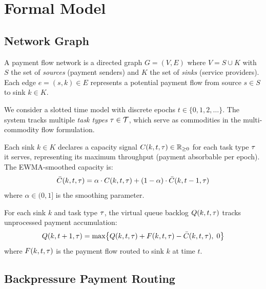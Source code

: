 \section{Formal Model}
\label{sec:model}

\subsection{Network Graph}

\begin{definition}
A payment flow network is a directed graph $G = (V, E)$ where $V = S \cup K$ with
$S$ the set of \emph{sources} (payment senders) and $K$ the set of \emph{sinks}
(service providers). Each edge $e = (s, k) \in E$ represents a potential payment
flow from source $s \in S$ to sink $k \in K$.
\end{definition}

We consider a slotted time model with discrete epochs $t \in \{0, 1, 2, \ldots\}$.
The system tracks multiple \emph{task types} $\tau \in \mathcal{T}$, which
serve as commodities in the multi-commodity flow formulation.

\begin{definition}
Each sink $k \in K$ declares a capacity signal $C(k, t, \tau) \in \mathbb{R}_{\geq 0}$
for each task type $\tau$ it serves, representing its maximum throughput
(payment absorbable per epoch). The EWMA-smoothed capacity is:
\begin{equation}
\label{eq:ewma}
\bar{C}(k, t, \tau) = \alpha \cdot C(k, t, \tau)
    + (1 - \alpha) \cdot \bar{C}(k, t-1, \tau)
\end{equation}
where $\alpha \in (0, 1]$ is the smoothing parameter.
\end{definition}

\begin{definition}
For each sink $k$ and task type $\tau$, the virtual queue backlog
$Q(k, t, \tau)$ tracks unprocessed payment accumulation:
\begin{equation}
\label{eq:queue}
Q(k, t+1, \tau) = \max\bigl\{Q(k, t, \tau) + F(k, t, \tau)
    - \bar{C}(k, t, \tau),\; 0\bigr\}
\end{equation}
where $F(k, t, \tau)$ is the payment flow routed to sink $k$ at time $t$.
\end{definition}

\subsection{Backpressure Payment Routing}

